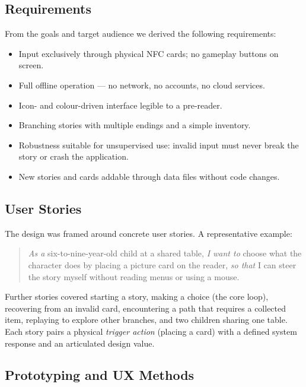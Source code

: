\subsection{Requirements}
From the goals and target audience we derived the following requirements:
\begin{itemize}
  \item Input exclusively through physical NFC cards; no gameplay buttons on
        screen.
  \item Full offline operation --- no network, no accounts, no cloud services.
  \item Icon- and colour-driven interface legible to a pre-reader.
  \item Branching stories with multiple endings and a simple inventory.
  \item Robustness suitable for unsupervised use: invalid input must never
        break the story or crash the application.
  \item New stories and cards addable through data files without code
        changes.
\end{itemize}

\subsection{User Stories}
The design was framed around concrete user stories. A representative example:

\begin{quote}
\emph{As a} six-to-nine-year-old child at a shared table, \emph{I want to}
choose what the character does by placing a picture card on the reader,
\emph{so that} I can steer the story myself without reading menus or using a
mouse.
\end{quote}

Further stories covered starting a story, making a choice (the core loop),
recovering from an invalid card, encountering a path that requires a
collected item, replaying to explore other branches, and two children
sharing one table. Each story pairs a physical \emph{trigger action}
(placing a card) with a defined system response and an articulated design
value.

\subsection{Prototyping and UX Methods}

